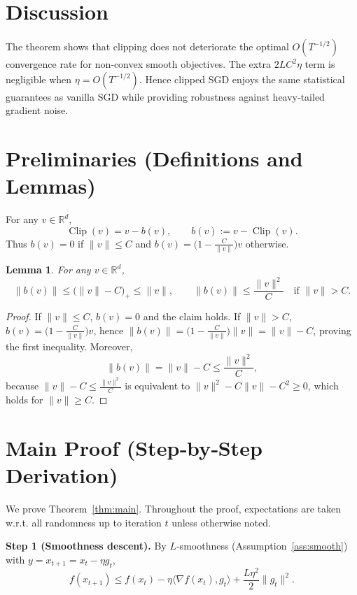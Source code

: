 \documentclass{article}
\newtheorem{lemma}{Lemma}
\newcommand{\R}{\mathbb{R}}
\begin{document}
\section*{Discussion}
The theorem shows that clipping does not deteriorate the optimal $O(T^{-1/2})$ convergence rate for non‑convex smooth objectives. The extra $2LC^{2}\eta$ term is negligible when $\eta=O(T^{-1/2})$. Hence clipped SGD enjoys the same statistical guarantees as vanilla SGD while providing robustness against heavy‑tailed gradient noise.

\newpage

\section*{Preliminaries (Definitions and Lemmas)}
\begin{definition}
For any $v\in\R^{d}$,
\[
\operatorname{Clip}(v)=v-b(v),\qquad 
b(v):=v-\operatorname{Clip}(v).
\]
Thus $b(v)=0$ if $\|v\|\le C$ and $b(v)=\bigl(1-\frac{C}{\|v\|}\bigr)v$ otherwise.
\end{definition}

\begin{lemma}\label{lem:bndbias}
For any $v\in\R^{d}$,
\[
\|b(v)\|\le\bigl(\|v\|-C\bigr)_{+}\le\|v\|,
\qquad
\|b(v)\|\le\frac{\|v\|^{2}}{C}\quad\text{if }\|v\|>C .
\]
\end{lemma}
\begin{proof}
If $\|v\|\le C$, $b(v)=0$ and the claim holds.  
If $\|v\|>C$, $b(v)=\bigl(1-\frac{C}{\|v\|}\bigr)v$, hence  
$\|b(v)\|=\bigl(1-\frac{C}{\|v\|}\bigr)\|v\|=\|v\|-C$, proving the first inequality.  
Moreover,
\[
\|b(v)\|=\|v\|-C\le\frac{\|v\|^{2}}{C},
\]
because $\|v\|-C\le\frac{\|v\|^{2}}{C}$ is equivalent to $\|v\|^{2}-C\|v\|-C^{2}\ge0$, which holds for $\|v\|\ge C$.
\end{proof}

\section*{Main Proof (Step‑by‑Step Derivation)}
We prove Theorem~\ref{thm:main}. Throughout the proof, expectations are taken w.r.t. all randomness up to iteration $t$ unless otherwise noted.

\bigskip
\noindent\textbf{Step 1 (Smoothness descent).}  
By $L$‑smoothness (Assumption~\ref{ass:smooth}) with $y=x_{t+1}=x_{t}-\eta g_{t}$,
\[
f(x_{t+1})\le f(x_{t})-\eta\langle\nabla f(x_{t}),g_{t}\rangle+\frac{L\eta^{2}}{2}\|g_{t}\|^{2}.
\tag{2}
\]
\end{document}
